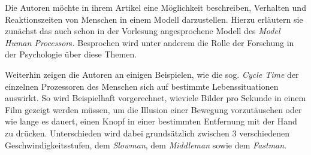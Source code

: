 \documentclass[a4paper,10pt]{article}
\begin{document}
\kopf
\renewcommand{\figurename}{Figure}

Die Autoren möchte in ihrem Artikel eine Möglichkeit beschreiben, Verhalten und Reaktionszeiten von Menschen in einem Modell darzustellen. Hierzu erläutern sie zunächst das auch schon in der Vorlesung angesprochene Modell des \textit{Model Human Processor}s. Besprochen wird unter anderem die Rolle der Forschung in der Psychologie über diese Themen.

Weiterhin zeigen die Autoren an einigen Beispielen, wie die sog. \textit{Cycle Time} der einzelnen Prozessoren des Menschen sich auf bestimmte Lebenssituationen auswirkt. So wird Beispielhaft vorgerechnet, wieviele Bilder pro Sekunde in einem Film gezeigt werden müssen, um die Illusion einer Bewegung vorzutäuschen oder wie lange es dauert, einen Knopf in einer bestimmten Entfernung mit der Hand zu drücken. Unterschieden wird dabei grundsätzlich zwischen 3 verschiedenen Geschwindigkeitsstufen, dem \textit{Slowman}, dem \textit{Middleman} sowie dem \textit{Fastman}.
\end{document}
